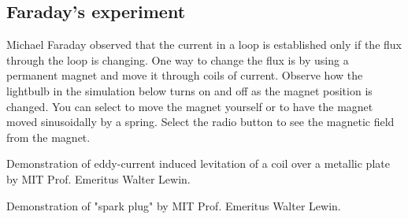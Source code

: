 \documentclass{ximera}
\begin{document}
\begin{example}
\subsection{Faraday's experiment}
Michael Faraday observed that the current in a loop is established only if the flux through the loop is changing. One way to change the flux is by using a permanent magnet and move it through coils of current. Observe how the lightbulb in the simulation below turns on and off as the magnet position is changed. You can select to move the magnet yourself or to have the magnet moved sinusoidally by a spring. Select the radio button to see the magnetic field from the magnet.

\begin{center}  
\end{center} 
\end{example}


\begin{example}
Demonstration of eddy-current induced levitation of a coil over a metallic plate by MIT Prof. Emeritus Walter Lewin.
\begin{center}  
\end{center} 
\end{example}





\begin{example}


Demonstration of "spark plug" by MIT Prof. Emeritus Walter Lewin.
\begin{center}  
\end{center} 


\end{example}





\end{document}
